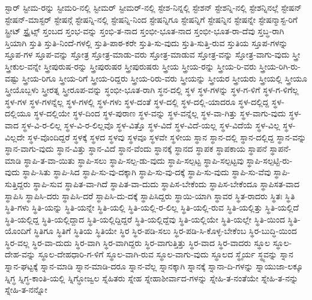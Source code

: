 {ಸ್ಟಾರ್
ಸ್ಟೀಮ-ರನ್ನು
ಸ್ಟೀಮರಿ-ನಲ್ಲಿ
ಸ್ಟೀಮರ್
ಸ್ಟೀಮರ್-ನಲ್ಲಿ
ಸ್ಟೇಶ-ನಿನ್ನಲ್ಲಿ
ಸ್ಟೇಶನ್
ಸ್ಟೇಶನ್ನಿ-ನಲ್ಲಿ
ಸ್ಟೇಶನ್ನಿನಲ್ಲೆ
ಸ್ಟೇಷನ್
ಸ್ಟೇಷನ್-ಮಾಸ್ಟರ್
ಸ್ಟೇಷನ್ಗೆ
ಸ್ಟೇಷನ್ನಿ-ನಲ್ಲಿ
ಸ್ಟೇಷನ್ನಿ-ನಿಂದ
ಸ್ಟೇಷನ್ನಿಗೂ
ಸ್ಟೇಷನ್ನಿಗೆ
ಸ್ಟೇಷನ್ನಿನ
ಸ್ಟೇಷನ್ನೇ
ಸ್ಟೇಷನ್ಮಾಸ್ಟ-ರಿಗೆ
ಸ್ಟ್ರೀಟ್
ಸ್ಟ್ರೈಟ್ಸ್
ಸ್ತಂಬದ
ಸ್ತಂಭ-ವನ್ನು
ಸ್ತಂಭಿ-ತ-ನಾದ
ಸ್ತಂಭೀ-ಭೂತ-ನಾದ
ಸ್ತಂಭೀ-ಭೂತ-ರಾ-ದೆವು
ಸ್ತಬ್ಧ-ರಾಗಿ
ಸ್ತಿಯಾಗಿ
ಸ್ತುತಿ
ಸ್ತುತಿ-ನಿಂದೆ-ಗಳಲ್ಲಿ
ಸ್ತುತಿ-ಪಾಠ-ಕರೇ
ಸ್ತುತಿ-ಸು-ವುದು
ಸ್ತುತಿ-ಸುತ್ತಿ-ರುವ
ಸ್ತುತಿಯ
ಸ್ತೂಪ-ಗಳನ್ನು
ಸ್ತೂಪ-ಗಳ
ಸ್ತೂಪ-ವನ್ನು
ಸ್ತೋತ್ರ
ಸ್ತೋತ್ರ-ಮಾಡು-ವರು
ಸ್ತೋತ್ರ-ಮಾಡುವ
ಸ್ತೋತ್ರ-ವನ್ನು
ಸ್ತೋತ್ರ-ವಾಗು-ವುದು
ಸ್ತ್ರೀ
ಸ್ತ್ರೀಕುಲ-ವನ್ನೇ
ಸ್ತ್ರೀಪುರುಷ-ರನ್ನು
ಸ್ತ್ರೀಪುರುಷರ
ಸ್ತ್ರೀಪುರುಷರು
ಸ್ತ್ರೀಯ
ಸ್ತ್ರೀಯ-ರನ್ನು
ಸ್ತ್ರೀಯ-ರಿ-ವರು
ಸ್ತ್ರೀಯ-ರಿಗಿ-ರು-ವಷ್ಟು
ಸ್ತ್ರೀಯ-ರಿಗೂ
ಸ್ತ್ರೀಯ-ರಿಗೆ
ಸ್ತ್ರೀಯ-ರಿದ್ದರು
ಸ್ತ್ರೀಯ-ರಿರು-ವರು
ಸ್ತ್ರೀಯನ್ನು
ಸ್ತ್ರೀಯರ
ಸ್ತ್ರೀಯರು
ಸ್ತ್ರೀಯಲ್ಲಿ
ಸ್ತ್ರೀಯೂ
ಸ್ತ್ರೀಯೊಬ್ಬಳು
ಸ್ತ್ರೀರತ್ನ
ಸ್ತ್ರೀರೂಪ-ವನ್ನು
ಸ್ಥಂಭೀ-ಭೂತ-ರಾಗಿ
ಸ್ಥನ-ದಲ್ಲಿ
ಸ್ಥಳ
ಸ್ಥಳ-ಗಳನ್ನು
ಸ್ಥಳ-ಗ-ಳಿಗೆ
ಸ್ಥಳ-ಗ-ಳಿಗೆಲ್ಲ
ಸ್ಥಳ-ಗಳ
ಸ್ಥಳ-ಗಳನ್ನೆಲ್ಲ
ಸ್ಥಳ-ಗಳಲ್ಲಿ
ಸ್ಥಳ-ಗಳು
ಸ್ಥಳ-ದಂತೆ
ಸ್ಥಳ-ದಲ್ಲಿ
ಸ್ಥಳ-ದಲ್ಲಿ-ಯಾದರೂ
ಸ್ಥಳ-ದಲ್ಲಿದ್ದ
ಸ್ಥಳ-ದಲ್ಲಿಯೂ
ಸ್ಥಳ-ದಲ್ಲಿಯೇ
ಸ್ಥಳ-ದಿಂದ
ಸ್ಥಳ-ಪುರಾಣ
ಸ್ಥಳ-ವನ್ನು
ಸ್ಥಳ-ವನ್ನೆಲ್ಲ
ಸ್ಥಳ-ವಾ-ಗಿತ್ತು
ಸ್ಥಳ-ವಾಗು-ವುದು
ಸ್ಥಳ-ವಾದ
ಸ್ಥಳ-ವಿ-ರ-ಲಿಲ್ಲ
ಸ್ಥಳ-ವಿ-ರ-ಲಿಲ್ಲವೊ
ಸ್ಥಳ-ವಿತ್ತೊ
ಸ್ಥಳ-ವಿದೆ
ಸ್ಥಳ-ವಿದೆ-ಯಲ್ಲ
ಸ್ಥಳ-ವಿದೆಯೆ
ಸ್ಥಳ-ವಿಲ್ಲ
ಸ್ಥಳ-ವಿಲ್ಲದೇ
ಸ್ಥಳ-ವೊಂದಿದ್ದರೆ
ಸ್ಥಳಕ್ಕೆ
ಸ್ಥಳದ
ಸ್ಥಳವು
ಸ್ಥಳವೂ
ಸ್ಥಳವೇ
ಸ್ಥಳೀಯ
ಸ್ಥಾನ
ಸ್ಥಾನ-ದಲ್ಲಿ
ಸ್ಥಾನ-ದಲ್ಲಿದ್ದ
ಸ್ಥಾನ-ವನ್ನು
ಸ್ಥಾನ-ವಾಗು-ವುದು
ಸ್ಥಾನ-ವಿತ್ತು
ಸ್ಥಾನ-ವಿದೆ
ಸ್ಥಾನ-ವೆಂದು
ಸ್ಥಾನಕ್ಕೆ
ಸ್ಥಾನದ
ಸ್ಥಾಪಕ
ಸ್ಥಾಪಕಾಯ
ಸ್ಥಾಪನೆ
ಸ್ಥಾಪನೆ-ಮಾಡಿ
ಸ್ಥಾಪಿ-ತ-ವಾ-ಯಿತು
ಸ್ಥಾಪಿ-ಸಲು
ಸ್ಥಾಪಿ-ಸಲ್ಪ-ಡು-ವುದು
ಸ್ಥಾಪಿ-ಸಲ್ಪಟ್ಟ
ಸ್ಥಾಪಿ-ಸಲ್ಪಟ್ಟವು
ಸ್ಥಾಪಿ-ಸಲ್ಪಟ್ಟಿ-ರು-ವುದು
ಸ್ಥಾಪಿ-ಸಿತು
ಸ್ಥಾಪಿ-ಸಿದ
ಸ್ಥಾಪಿ-ಸು-ವು-ದಕ್ಕಾಗಿ
ಸ್ಥಾಪಿ-ಸು-ವು-ದಕ್ಕೆ
ಸ್ಥಾಪಿ-ಸು-ವುದು
ಸ್ಥಾಪಿ-ಸು-ವೆವು
ಸ್ಥಾಪಿ-ಸುತ್ತಿದ್ದರು
ಸ್ಥಾಪಿ-ಸುವ
ಸ್ಥಾಪಿತ-ವಾ-ಗಿದೆ
ಸ್ಥಾಪಿತ-ವಾ-ದುದು
ಸ್ಥಾಪಿಸ-ಬೇಕೆಂದು
ಸ್ಥಾಪಿಸ-ಬೇಕೆಂದೂ
ಸ್ಥಾಪಿಸತ-ವಾದ
ಸ್ಥಾಪಿಸಿ
ಸ್ಥಾಪಿಸಿ-ದರು
ಸ್ಥಾಪಿಸಿ-ದರೆ
ಸ್ಥಾಪಿಸಿ-ದು-ದಕ್ಕೆ
ಸ್ಥಾಪಿಸಿದ್ದರು
ಸ್ಥಾಯಿ-ಯಾಗಿ
ಸ್ಥಾವರ
ಸ್ಥಿತ-ರಾದರು
ಸ್ಥಿತಃ
ಸ್ಥಿತಿ
ಸ್ಥಿತಿ-ಗಳು
ಸ್ಥಿತಿ-ಯನ್ನು
ಸ್ಥಿತಿ-ಯನ್ನೇ
ಸ್ಥಿತಿ-ಯಲ್ಲಿ
ಸ್ಥಿತಿ-ಯಲ್ಲಿ-ರ-ಲಿಲ್ಲ
ಸ್ಥಿತಿ-ಯಲ್ಲಿ-ರುವ
ಸ್ಥಿತಿ-ಯಲ್ಲಿತ್ತು
ಸ್ಥಿತಿ-ಯಲ್ಲಿದೆ
ಸ್ಥಿತಿ-ಯಲ್ಲಿದ್ದ
ಸ್ಥಿತಿ-ಯಲ್ಲಿದ್ದಾದ
ಸ್ಥಿತಿ-ಯಲ್ಲಿದ್ದಿದ್ದರೆ
ಸ್ಥಿತಿ-ಯಲ್ಲಿದ್ದೆವು
ಸ್ಥಿತಿ-ಯಲ್ಲಿಯೇ
ಸ್ಥಿತಿ-ಯಲ್ಲೇ
ಸ್ಥಿತಿ-ಯಿಂದ
ಸ್ಥಿತಿ-ಯೊಂದಿಗೆ
ಸ್ಥಿತಿಗೂ
ಸ್ಥಿತಿಗೆ
ಸ್ಥಿತಿಯ
ಸ್ಥಿತಿಯೇ
ಸ್ಥಿರ
ಸ್ಥಿರ-ಪಡಿ-ಸಲು
ಸ್ಥಿರ-ಪಡಿ-ಸಿ-ಕೊಳ್ಳ-ಬೇಕೆಂಬ
ಸ್ಥಿರ-ಬುದ್ಧಿ-ಯಿಂದ
ಸ್ಥಿರ-ವಲ್ಲ
ಸ್ಥಿರ-ವಾ-ದುದು
ಸ್ಥಿರ-ವಾಗಿ
ಸ್ಥಿರ-ವಾಗಿದ್ದರು
ಸ್ಥಿರ-ವಾಗುತ್ತಿತ್ತು
ಸ್ಥಿರ-ವಾದ
ಸ್ಥಿರ-ವಾದರು
ಸ್ಥೂಲ
ಸ್ಥೂಲ-ದೇಹ-ವನ್ನು
ಸ್ಥೂಲ-ದೇಹಧಾರಿ-ಗ-ಳಿಗೆ
ಸ್ಥೂಲ-ವಾಗಿ-ರುವ
ಸ್ಥೂಲ-ವಾಗು-ವುದು
ಸ್ಥೂಲದ
ಸ್ಥೈರ್ಯ
ಸ್ಥ್ಯವನ್ನು
ಸ್ನಾನ
ಸ್ನಾನ-ಘಟ್ಟಕ್ಕೆ
ಸ್ನಾನ-ಮಾಡಿ
ಸ್ನಾನ-ಮಾಡಿ-ದರೂ
ಸ್ನಾನ-ವೆಲ್ಲ
ಸ್ನಾನಕ್ಕಾಗಿ
ಸ್ನಾನಕ್ಕೆ
ಸ್ನಾನಾ-ದಿ-ಗಳನ್ನು
ಸ್ನಾಯುಜಾ-ಲಕ್ಕೂ
ಸ್ನಿಗ್ಧ
ಸ್ನಿಗ್ಧ-ಕಾಂತಿ-ಯಲ್ಲಿ
ಸ್ನಿಗ್ಧೋಜ್ವಲ
ಸ್ನೆಹಿತರು
ಸ್ನೇಹ
ಸ್ನೇಹಾಶೀರ್ವಾದ-ಗಳನ್ನು
ಸ್ನೇಹಿ-ತ-ನಂತೆಯೇ
ಸ್ನೇಹಿ-ತ-ನನ್ನು
ಸ್ನೇಹಿ-ತ-ನನ್ನೋ
}
